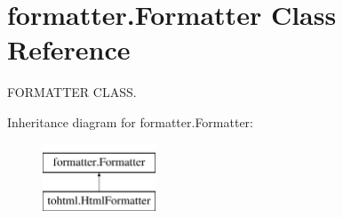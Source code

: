 \hypertarget{classformatter_1_1_formatter}{}\section{formatter.\+Formatter Class Reference}
\label{classformatter_1_1_formatter}


F\+O\+R\+M\+A\+T\+T\+ER C\+L\+A\+SS.  


Inheritance diagram for formatter.\+Formatter\+:\begin{figure}[H]
\begin{center}
\leavevmode
\includegraphics[height=2.000000cm]{classformatter_1_1_formatter}
\end{center}
\end{figure}
